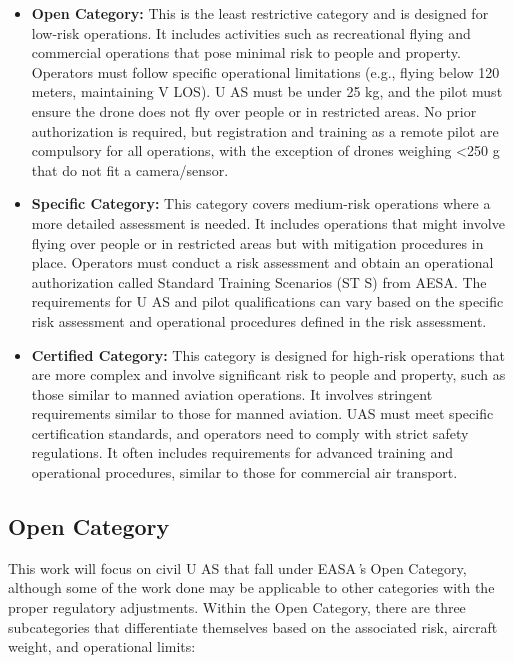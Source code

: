 \begin{itemize}
    \item \textbf{Open Category:} This is the least restrictive category and is designed for low-risk operations. It includes activities such as recreational flying and commercial operations that pose minimal risk to people and property. Operators must follow specific operational limitations (e.g., flying below 120 meters, maintaining V LOS). U AS must be under 25 kg, and the pilot must ensure the drone does not fly over people or in restricted areas. No prior authorization is required, but registration and training as a remote pilot are compulsory for all operations, with the exception of drones weighing <250 g that do not fit a camera/sensor.

    \item \textbf{Specific Category:} This category covers medium-risk operations where a more detailed assessment is needed. It includes operations that might involve flying over people or in restricted areas but with mitigation procedures in place. Operators must conduct a risk assessment and obtain an operational authorization called Standard Training Scenarios (ST S) from AESA. The requirements for U AS and pilot qualifications can vary based on the specific risk assessment and operational procedures defined in the risk assessment.

    \item \textbf{Certified Category:} This category is designed for high-risk operations that are more complex and involve significant risk to people and property, such as those similar to manned aviation operations. It involves stringent requirements similar to those for manned aviation. UAS must meet specific certification standards, and operators need to comply with strict safety regulations. It often includes requirements for advanced training and operational procedures, similar to those for commercial air transport.
\end{itemize}

\subsection{Open Category}

This work will focus on civil U AS that fall under EASA\textsf\textit{'}s Open Category, although
some of the work done may be applicable to other categories with the proper regulatory adjustments.
Within the Open Category, there are three subcategories that differentiate themselves based on the associated risk, aircraft weight, and operational limits:

